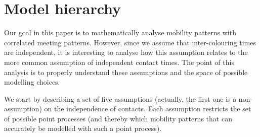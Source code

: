 \documentclass{article}
\begin{document}
\section{Model hierarchy}
\label{sec:hierarchy}
Our goal in this paper is to mathematically analyse mobility patterns
with correlated meeting patterns. However, since we assume that
inter-colouring times are independent, it is interesting to analyse
how this assumption relates to the more common assumption of
independent contact times. The point of this analysis is to properly
understand these assumptions and the space of possible modelling
choices.

We start by describing a set of five assumptions (actually, the first
one is a non-assumption) on the independence of contacts. Each
assumption restricts the set of possible point processes (and thereby
which mobility patterns that can accurately be modelled with such a
point process).
\end{document}
